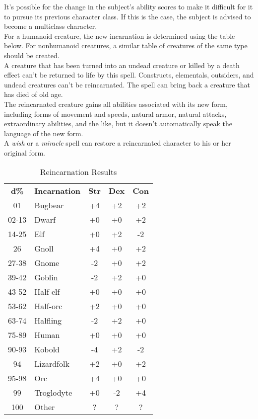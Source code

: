 It's possible for the change in the subject's ability scores to make it difficult for it to pursue its previous character class. If this is the case, the subject is advised to become a multiclass character.\\
For a humanoid creature, the new incarnation is determined using the table below. For nonhumanoid creatures, a similar table of creatures of the same type should be created.\\
A creature that has been turned into an undead creature or killed by a death effect can't be returned to life by this spell. Constructs, elementals, outsiders, and undead creatures can't be reincarnated. The spell can bring back a creature that has died of old age.\\
The reincarnated creature gains all abilities associated with its new form, including forms of movement and speeds, natural armor, natural attacks, extraordinary abilities, and the like, but it doesn't automatically speak the language of the new form. \\
A \textit{wish }or a \textit{miracle }spell can restore a reincarnated character to his or her original form.\\

\begin{table}[htb]
\caption{Reincarnation Results}
\centering
\begin{tabular}{c l c c c}
\textbf{d\%} & \textbf{Incarnation} & \textbf{Str} & \textbf{Dex} & \textbf{Con}\\
01 & Bugbear & +4 & +2 & +2\\
02-13 & Dwarf & +0 & +0 & +2\\
14-25 & Elf & +0 & +2 & -2\\
26 & Gnoll & +4 & +0 & +2\\
27-38 & Gnome & -2 & +0 & +2\\
39-42 & Goblin & -2 & +2 & +0\\
43-52 & Half-elf & +0 & +0 & +0\\
53-62 & Half-orc & +2 & +0 & +0\\
63-74 & Halfling & -2 & +2 & +0\\
75-89 & Human & +0 & +0 & +0\\
90-93 & Kobold & -4 & +2 & -2\\
94 & Lizardfolk & +2 & +0 & +2\\
95-98 & Orc & +4 & +0 & +0\\
99 & Troglodyte & +0 & -2 & +4\\
100 & Other & ? & ? & ?\\
\end{tabular}
\end{table}
